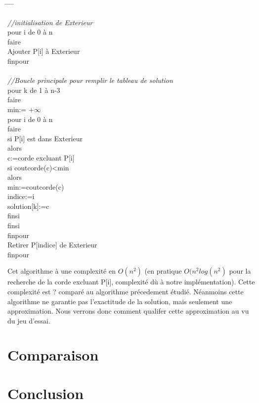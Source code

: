 \documentclass[a4paper,10pt]{article}
\begin{document}
 
 
\begin{tabbing}
\hspace{0.5cm} \= \hspace{0.5cm}  \= \hspace{0.5cm} \= \hspace{0.5cm} \= \kill


\textit{//initialisation de Exterieur}\\
pour i de 0 à n\\
faire\\
\> Ajouter P[i] à Exterieur\\
finpour\\
\\
\textit{//Boucle principale pour remplir le tableau de solution}\\
pour k de 1 à n-3\\
faire\\
    \> min:= $+\infty$ \\ 
    \> pour i de 0 à n\\
    \> faire\\
        \> \> si P[i] est dans Exterieur\\
        \> \> alors\\
            \> \> \> c:=corde excluant P[i]\\
            \> \> \> si coutcorde(c)<min\\
            \> \> \> alors\\
                \> \> \> \> min:=coutcorde(c)\\
                \> \> \> \> indice:=i\\
                \> \> \> \> solution[k]:=c\\
            \> \> \> finsi\\
        \> \> finsi\\
    \> finpour\\
    \> Retirer P[indice] de Exterieur\\
finpour\\
\end{tabbing}
 

Cet algorithme à une complexité en $O(n^2)$ (en pratique $O(n^2log(n^2)$ pour la recherche de la corde excluant P[i], complexité dù à notre implémentation).
Cette complexité est ? comparé au algorithme précedement étudié.
Néanmoins cette algorithme ne garantie pas l'exactitude de la solution, mais seulement une approximation.
Nous verrons donc comment qualifer cette approximation au vu du jeu d'essai.


\section{Comparaison}

\section{Conclusion}
\end{document}
